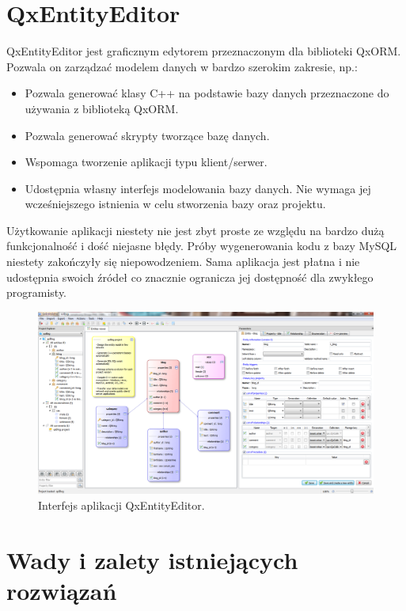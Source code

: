 \documentclass[12pt]{report}
\begin{document}
\section{QxEntityEditor}

QxEntityEditor jest graficznym edytorem przeznaczonym dla biblioteki QxORM. Pozwala on zarządzać modelem danych w bardzo szerokim zakresie, np.:

\begin{itemize}
\item{Pozwala generować klasy C++ na podstawie bazy danych przeznaczone do używania z biblioteką QxORM.}
\item{Pozwala generować skrypty tworzące bazę danych.}
\item{Wspomaga tworzenie aplikacji typu klient/serwer.}
\item{Udostępnia własny interfejs modelowania bazy danych. Nie wymaga jej wcześniejszego istnienia w celu stworzenia bazy oraz projektu.}
\end{itemize}

Użytkowanie aplikacji niestety nie jest zbyt proste ze względu na bardzo dużą funkcjonalność i dość niejasne błędy. Próby wygenerowania kodu z bazy MySQL niestety zakończyły się niepowodzeniem. Sama aplikacja jest płatna i nie udostępnia swoich źródeł co znacznie ogranicza jej dostępność dla zwykłego programisty.

\begin{figure}[h]
	\centering
	\includegraphics[width=1\textwidth]{images/qxentity.png}
	\caption{Interfejs aplikacji QxEntityEditor.}
\end{figure}

\FloatBarrier

\section{Wady i zalety istniejących rozwiązań}
\end{document}
